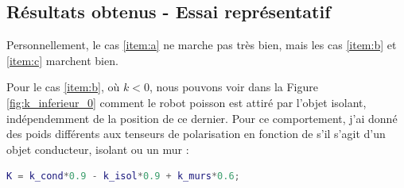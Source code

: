\subsection{Résultats obtenus - Essai représentatif}

Personnellement, le cas \ref{item:a} ne marche pas très bien, mais les cas \ref{item:b} et \ref{item:c} marchent bien. \vspace{0.2cm}

Pour le cas \ref{item:b}, où $k < 0$, nous pouvons voir dans la Figure \ref{fig:k_inferieur_0} comment le robot poisson est attiré par l'objet isolant, indépendemment de la position de ce dernier. 
Pour ce comportement, j'ai donné des poids différents aux tenseurs de polarisation en fonction de s'il s'agit d'un objet conducteur, isolant ou un mur :
\begin{lstlisting}[language=matlab, caption={Extrait du fichier \mcode{f_currents.m}}, firstnumber = 77, aboveskip=-0.6 \baselineskip, belowskip=-0.4 \baselineskip]
K = k_cond*0.9 - k_isol*0.9 + k_murs*0.6;
\end{lstlisting}

